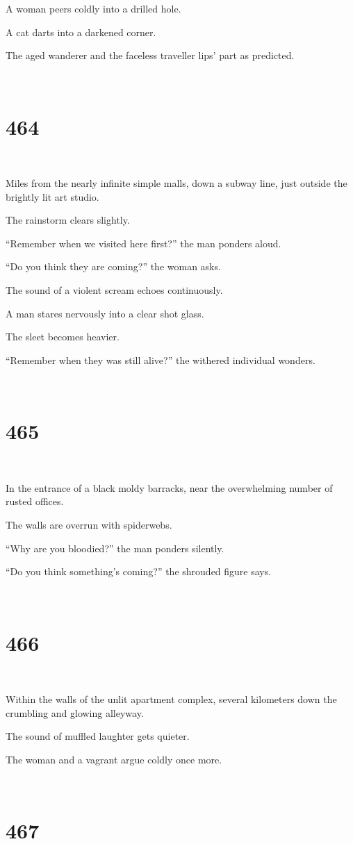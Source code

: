 \documentclass{report}
\begin{document}
A woman peers coldly into a drilled hole.

A cat darts into a darkened corner.

The aged wanderer and the faceless traveller lips' part as predicted.

~
\chapter*{464}
~

Miles from the nearly infinite simple malls, down a subway line, just outside the brightly lit art studio.

The rainstorm clears slightly.

``Remember when we visited here first?'' the man ponders aloud.

``Do you think they are coming?'' the woman asks.

The sound of a violent scream echoes continuously.

A man stares nervously into a clear shot glass.

The sleet becomes heavier.

``Remember when they was still alive?'' the withered individual wonders.

~
\chapter*{465}
~

In the entrance of a black moldy barracks, near the overwhelming number of rusted offices.

The walls are overrun with spiderwebs.

``Why are you bloodied?'' the man ponders silently.

``Do you think something's coming?'' the shrouded figure says.

~
\chapter*{466}
~

Within the walls of the unlit apartment complex, several kilometers down the crumbling and glowing alleyway.

The sound of muffled laughter gets quieter.

The woman and a vagrant argue coldly once more.

~
\chapter*{467}
~
\end{document}
